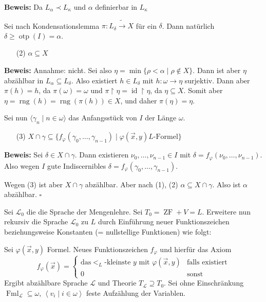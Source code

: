 \documentclass[a4paper,fontsize=11pt]{scrartcl}
\newcommand{\rng}{\operatorname{rng}}
\newcommand{\ZF}{\operatorname{ZF}}
\newcommand{\Fml}{\operatorname{Fml}}
\newcommand{\otp}{\operatorname{otp}}
\newcommand{\id}{\operatorname{id}}
\begin{document}
    {\bf Beweis:} Da $L_{\alpha}\prec L_{\kappa}$ und $\alpha$ definierbar in $L_{\kappa}$ %
    
    Sei nach Kondensationslemma $\pi\colon L_{\delta} \tilde\to X$ für ein $\delta$.
    Dann natürlich $\delta \ge\otp(I)=\alpha$.
    \begin{itemize}\item[(2)] $\alpha\subseteq X$ \end{itemize} 
    
    {\bf Beweis:} Annahme: nicht.
      Sei also $\eta=\min\{ \rho<\alpha\mid \rho\not\in X\}$.
      Dann ist aber $\eta$ abzählbar in $L_{\alpha}\subseteq L_{\delta}$.
      Also existiert $h\in L_{\delta}$ mit $h\colon \omega\to\eta$ surjektiv.
      Dann aber $\pi(h)=h$, da $\pi(\omega)=\omega$ und $\pi\upharpoonright\eta = \id\upharpoonright \eta$, da $\eta\subseteq X$.
      Somit aber $\eta=\rng(h)=\rng(\pi(h))\in X$, und daher $\pi(\eta)=\eta$. %
      
    Sei nun $\langle \gamma_n\mid n\in\omega\rangle$ das Anfangsstück von $I$ der Länge $\omega$.
    \begin{itemize}\item[(3)] $X\cap \gamma\subseteq\{ f_{\varphi}(\gamma_0,\ldots,\gamma_{n-1})\mid \varphi(\vec x, y) L\mbox{-Formel}\}$ \end{itemize}
    
    {\bf Beweis:} Sei $\delta\in X\cap \gamma$.
      Dann existieren $\nu_0,\ldots,\nu_{n-1}\in I$ mit $\delta =f_{\varphi}(\nu_0,\ldots,\nu_{n-1})$.
      Also wegen $I$ gute Indiscernibles $\delta=f_{\varphi}(\gamma_0,\ldots,\gamma_{n-1})$. %
      
    Wegen (3) ist aber $X\cap \gamma$ abzählbar.
    Aber nach (1), (2) $\alpha\subseteq X\cap\gamma$.
    Also ist $\alpha$ abzählbar. \hfill $\square$


Sei $\mathcal{L}_0$ die die Sprache der Mengenlehre. Sei
$T_0=\ZF+V=L$. Erweitere nun rekursiv die Sprache $\mathcal{L}_0$ zu
$L$ durch Einführung neuer Funktionszeichen beziehungsweise Konstanten
(= nullstellige Funktionen) wie folgt:

Sei $\varphi(\vec{x},y)$ Formel. Neues Funktionszeichen $f_\varphi$
und hierfür das Axiom
$$f_\varphi(\vec{x})=\left\{\begin{array}{cl} \mbox{das
}<_L\mbox{-kleinste }y\mbox{ mit }\varphi(\vec{x},y)&\mbox{falls
  existiert} \\ 0 & \mbox{sonst}\end{array}\right.$$ Ergibt abzählbare
Sprache $\mathcal{L}$ und Theorie $T_{\mathcal{L}}\supseteq T_0$. Sei
ohne Einschränkung $\Fml_{\mathcal{L}}\subseteq\omega$,
$\left<v_i\mid i\in\omega\right>$ feste Aufzählung der Variablen.
\end{document}
